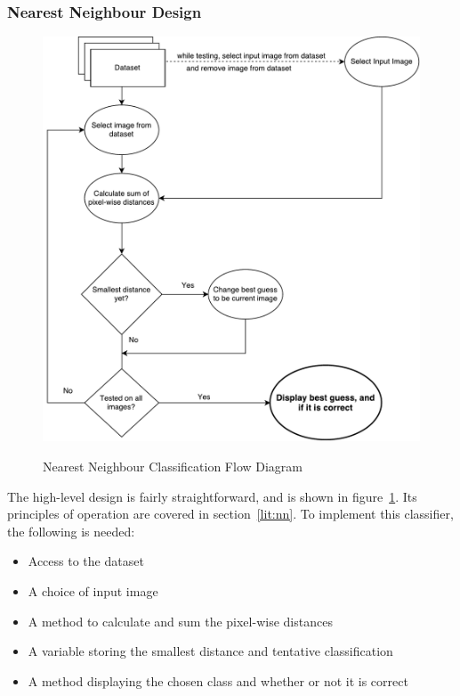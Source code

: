 \subsubsection{Nearest Neighbour Design}
\begin{figure}
\centering
\includegraphics[width=\textwidth]{figures/nearest-neighbour}
\label{fig:nn}
\caption{Nearest Neighbour Classification Flow Diagram}
\centering
\end{figure}


The high-level design is fairly straightforward, and is shown in figure~\ref{fig:nn}. Its principles of operation are covered in section~\ref{lit:nn}. To implement this classifier, the following is needed:

\begin{itemize}
	\item Access to the dataset
	\item A choice of input image
	\item A method to calculate and sum the pixel-wise distances
	\item A variable storing the smallest distance and tentative classification
	\item A method displaying the chosen class and whether or not it is correct
\end{itemize}


